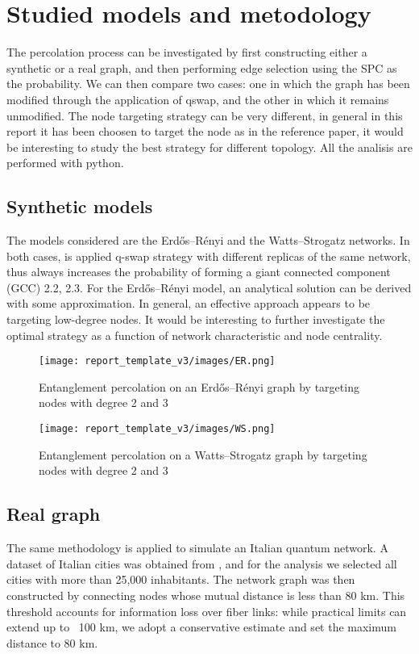 \section{Studied models and metodology}

The percolation process can be investigated by first constructing either a synthetic or a real graph, and then performing edge selection using the SPC as the probability.
We can then compare two cases: one in which the graph has been modified through the application of qswap, and the other in which it remains unmodified.
The node targeting strategy can be very different, in general in this report it has been choosen to target the node as in the reference paper, it would be interesting to study the best strategy for different topology. All the analisis are performed with python.

\subsection{Synthetic models}
The models considered are the Erdős–Rényi and the Watts–Strogatz networks. In both cases,  is applied q-swap strategy with different replicas of the same network, thus always increases the probability of forming a giant connected component (GCC) 2.2, 2.3. For the Erdős–Rényi model, an analytical solution can be derived with some approximation. In general, an effective approach appears to be targeting low-degree nodes. It would be interesting to further investigate the optimal strategy as a function of network characteristic and node centrality. 

\begin{multicols}{2}

\begin{figure}[H]
    \centering
    \label{ER}
    \texttt{[image: report\_template\_v3/images/ER.png]}
    \caption{\footnotesize Entanglement percolation on an Erdős–Rényi graph by targeting nodes with degree 2 and 3}
\end{figure}

\begin{figure}[H]
    \centering
    \label{WS}
    \texttt{[image: report\_template\_v3/images/WS.png]}
    \caption{\footnotesize Entanglement percolation on a Watts–Strogatz graph by targeting nodes with degree 2 and 3}
\end{figure}

\end{multicols}

\subsection{Real graph}
The same methodology is applied to simulate an Italian quantum network.
A dataset of Italian cities was obtained from \cite{geonames}, and for the analysis we selected all cities with more than 25,000 inhabitants. The network graph was then constructed by connecting nodes whose mutual distance is less than 80 km. This threshold accounts for information loss over fiber links: while practical limits can extend up to ~100 km, we adopt a conservative estimate and set the maximum distance to 80 km.

